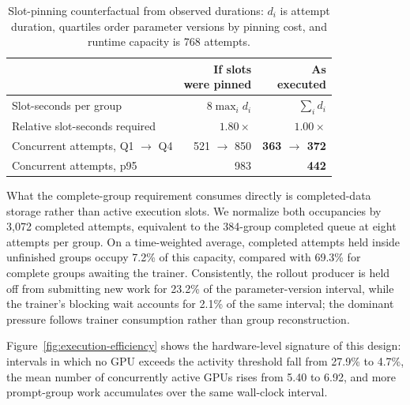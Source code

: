\documentclass[letterpaper]{article}
\begin{document}
\begin{table}[!t]
\centering
{\small
\setlength{\tabcolsep}{3pt}
\begin{tabular*}{\columnwidth}{@{\extracolsep{\fill}}lrr@{}}
\toprule
 & \shortstack[r]{If slots\\were pinned} & \shortstack[r]{\textbf{As}\\\textbf{executed}} \\
\midrule
Slot-seconds per group & $8\max_i d_i$ & $\sum_i d_i$ \\
Relative slot-seconds required & $1.80\times$ & \textbf{$1.00\times$} \\
Concurrent attempts, Q1 $\to$ Q4 & 521 $\to$ 850 & \textbf{363 $\to$ 372} \\
Concurrent attempts, p95 & 983 & \textbf{442} \\
\bottomrule
\end{tabular*}
}
\caption{Slot-pinning counterfactual from observed durations: $d_i$ is attempt duration, quartiles order parameter versions by pinning cost, and runtime capacity is 768 attempts.}
\label{tab:pinning}
\end{table}

What the complete-group requirement consumes directly is completed-data storage rather than active execution slots.
We normalize both occupancies by 3,072 completed attempts, equivalent to the 384-group completed queue at eight attempts per group.
On a time-weighted average, completed attempts held inside unfinished groups occupy 7.2\% of this capacity, compared with 69.3\% for complete groups awaiting the trainer.
Consistently, the rollout producer is held off from submitting new work for 23.2\% of the parameter-version interval, while the trainer's blocking wait accounts for 2.1\% of the same interval; the dominant pressure follows trainer consumption rather than group reconstruction.

Figure~\ref{fig:execution-efficiency} shows the hardware-level signature of this design: intervals in which no GPU exceeds the activity threshold fall from 27.9\% to 4.7\%, the mean number of concurrently active GPUs rises from 5.40 to 6.92, and more prompt-group work accumulates over the same wall-clock interval.
\end{document}
